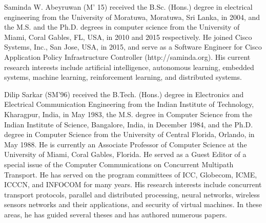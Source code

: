 \documentclass[]{IEEEtran}
\begin{document}


\begin{IEEEbiography}
{Saminda W. Abeyruwan} (M’ 15) received the B.Sc. (Hons.) degree in electrical
engineering from the University of Moratuwa, Moratuwa, Sri Lanka, in 2004, and
the M.S. and the Ph.D. degrees in computer science from the University of Miami,
Coral Gables, FL, USA, in 2010 and 2015 respectively.  He joined Cisco Systems,
Inc., San Jose, USA, in 2015, and serve as a Software Engineer for Cisco
Application Policy Infrastructure Controller (http://saminda.org). His current
research interests include artificial intelligence, autonomous learning,
embedded systems, machine learning, reinforcement learning, and distributed
systems.
\end{IEEEbiography}
\begin{IEEEbiography}
{Dilip Sarkar} 
(SM'96) received the B.Tech. (Hons.) degree in Electronics and Electrical
Communication Engineering from the Indian Institute of Technology, Kharagpur,
India, in May 1983, the M.S. degree in Computer Science from the Indian
Institute of Science, Bangalore, India, in December 1984, and the Ph.D. degree
in Computer Science from the University of Central Florida, Orlando, in May
1988. 
He is currently an Associate Professor of Computer Science at the University of
Miami, Coral Gables, Florida.  He served as a Guest Editor of a special issue of
the Computer Communications on Concurrent Multipath Transport. He has served on
the program committees of ICC, Globecom, ICME, ICCCN, and INFOCOM for many
years. His research interests include concurrent transport protocols, parallel
and distributed processing, neural networks, wireless sensors networks and their
applications, and security of virtual machines. In these areas, he has guided
several theses and has authored numerous papers.
\end{IEEEbiography}
\end{document}
